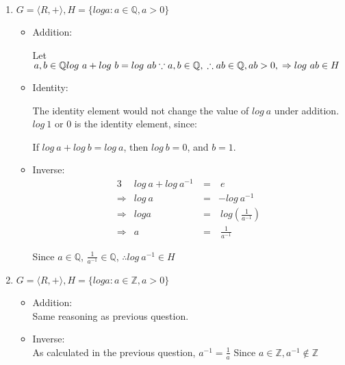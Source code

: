 \documentclass[12pt]{article}
\begin{document}
\begin{enumerate}
\item $G = \langle R, + \rangle, H = \{log a: a \in \mathbb{Q}, a > 0\}$
  \begin{itemize}
    \item 
      Addition:
      
      Let $a, b \in \mathbb{Q} \\
      log\ a + log\ b = log\ ab \\
      \because a, b \in \mathbb{Q},\\
      \therefore ab \in \mathbb{Q}, ab > 0, \\
      \Rightarrow log\ ab \in H$
    \item 
      Identity:
      
      The identity element would not change the value of $log\ a$ under addition. 
      $log\ 1$ or $0$ is the identity element, since:

      If $log\ a + log\ b = log\ a$, then $log\ b = 0$, and $b = 1$.


    \item 
      Inverse:
        \begin{alignat*}{3}
           &log\ a + log\ a^{-1} \ &= &\ e \\ 
          \Rightarrow & log\ a &= & -log\ a^{-1} \\
          \Rightarrow & log a   &= &\ log(\frac{1}{a^{-1}}) \\
          \Rightarrow & a      &= &\ \frac{1}{a^{-1}}
        \end{alignat*}
      
      Since $a \in \mathbb{Q}$, $\frac{1}{a^{-1}} \in \mathbb{Q}$, $\therefore log\ a^{-1} \in H$
       
    \end{itemize}

\item $G = \langle R, + \rangle, H = \{log a: a \in \mathbb{Z}, a > 0\}$
  \begin{itemize}
    \item 
      Addition: \\

      Same reasoning as previous question.
    \item 
      Inverse: \\
      As calculated in the previous question, $a^{-1} = \frac{1}{a}$
      Since $a \in \mathbb{Z}, a^{-1} \notin \mathbb{Z}$
  \end{itemize}



\end{enumerate}
\end{document}
